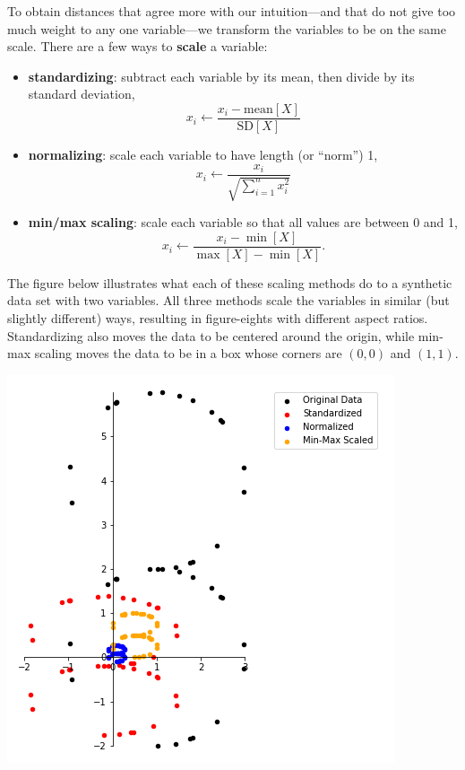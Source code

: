 \documentclass[11pt]{article}
\makeatletter
\def\maxwidth{\ifdim\Gin@nat@width>\linewidth\linewidth
    \else\Gin@nat@width\fi}
\let\Oldincludegraphics\includegraphics
\renewcommand{\includegraphics}[1]{\Oldincludegraphics[width=.8\maxwidth]{#1}}
\providecommand{\tightlist}{%
      \setlength{\itemsep}{0pt}\setlength{\parskip}{0pt}}
\makeatother
\begin{document}
    To obtain distances that agree more with our intuition---and that do not
give too much weight to any one variable---we transform the variables to
be on the same scale. There are a few ways to \textbf{scale} a variable:

\begin{itemize}
\tightlist
\item
  \textbf{standardizing}: subtract each variable by its mean, then
  divide by its standard deviation,
  \[ x_i \leftarrow \frac{x_i - \text{mean}[X]}{\text{SD}[X]} \]
\item
  \textbf{normalizing}: scale each variable to have length (or ``norm'')
  1, \[ x_i \leftarrow \frac{x_i}{\sqrt{\sum_{i=1}^n x_i^2}} \]
\item
  \textbf{min/max scaling}: scale each variable so that all values are
  between 0 and 1,
  \[x_i \leftarrow \frac{x_i - \min[X]}{\max[X] - \min[X]}.\]
\end{itemize}

The figure below illustrates what each of these scaling methods do to a
synthetic data set with two variables. All three methods scale the
variables in similar (but slightly different) ways, resulting in
figure-eights with different aspect ratios. Standardizing also moves the
data to be centered around the origin, while min-max scaling moves the
data to be in a box whose corners are \((0, 0)\) and \((1, 1)\).

\includegraphics{scaling.png}
\end{document}
